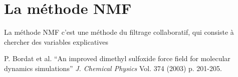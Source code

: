 \documentclass[11pt,letterpaper,twocolumn]{article}
\begin{document}

\section{La méthode NMF}
\justify
La méthode NMF c'est une méthode du filtrage collaboratif, qui consiste à chercher des variables explicatives 

\begin{thebibliography}{9}
 P. Bordat et al. ``An improved dimethyl sulfoxide force field for molecular dynamics simulations'' \textit{J. Chemical Physics} Vol. 374 (2003) p. 201-205.
\end{thebibliography} 
\end{document}
